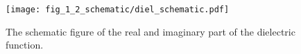 \begin{figure}[htb]
 \centering
  \texttt{[image: fig\_1\_2\_schematic/diel\_schematic.pdf]}
  \caption{The schematic figure of the real and imaginary part of the dielectric function. }
\label{Fig:schematic}
\end{figure}